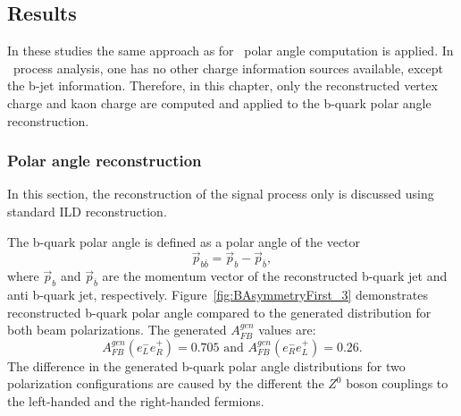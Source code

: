 


\subsection{Results}
\label{sec:BBBarresults}
In these studies the same approach as for \ttbar\ polar angle computation is applied. In \bbbar\ process analysis, one has no other charge information sources available, except the b-jet information. 
Therefore, in this chapter, only the reconstructed vertex charge and kaon charge are computed and applied to the b-quark polar angle reconstruction. 

\subsubsection{Polar angle reconstruction}
In this section, the reconstruction of the signal process only is discussed using standard ILD reconstruction. %

The b-quark polar angle is defined as a polar angle of the vector
\begin{equation}
	\vec{p}_{b\bar{b}} = \vec{p}_{b} - \vec{p}_{\bar{b}},
\end{equation}
where $\vec{p}_{b}$ and $\vec{p}_{\bar{b}}$ are the momentum vector of the reconstructed b-quark jet and anti b-quark jet, respectively.
Figure~\ref{fig:BAsymmetryFirst_3} demonstrates reconstructed b-quark polar angle compared to the generated distribution for both beam polarizations. 
The generated $A_{FB}^{gen}$ values are:
\begin{equation}
	A_{FB}^{gen}(e^-_L e^+_R) = 0.705\text{ and }A_{FB}^{gen}(e^-_R e^+_L) = 0.26.
\end{equation} 
The difference in the generated b-quark polar angle distributions for two polarization configurations are caused by the different the $Z^0$ boson couplings to the left-handed and the right-handed fermions. 

